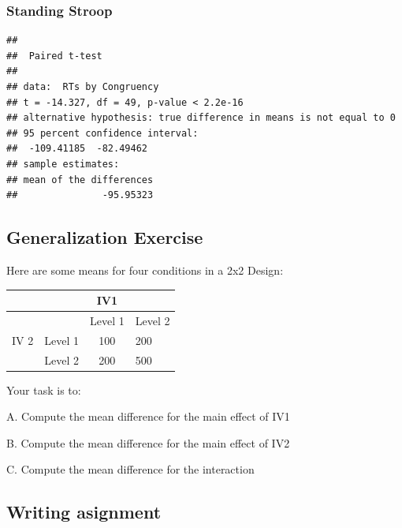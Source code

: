 \documentclass[]{book}
\newenvironment{Shaded}{\begin{snugshade}}{\end{snugshade}}
\newcommand{\KeywordTok}[1]{\textcolor[rgb]{0.13,0.29,0.53}{\textbf{#1}}}
\newcommand{\DataTypeTok}[1]{\textcolor[rgb]{0.13,0.29,0.53}{#1}}
\newcommand{\StringTok}[1]{\textcolor[rgb]{0.31,0.60,0.02}{#1}}
\newcommand{\OtherTok}[1]{\textcolor[rgb]{0.56,0.35,0.01}{#1}}
\newcommand{\OperatorTok}[1]{\textcolor[rgb]{0.81,0.36,0.00}{\textbf{#1}}}
\newcommand{\NormalTok}[1]{#1}
\begin{document}
\subsubsection{Standing Stroop}\label{standing-stroop}

\begin{Shaded}
\end{Shaded}

\begin{verbatim}
## 
##  Paired t-test
## 
## data:  RTs by Congruency
## t = -14.327, df = 49, p-value < 2.2e-16
## alternative hypothesis: true difference in means is not equal to 0
## 95 percent confidence interval:
##  -109.41185  -82.49462
## sample estimates:
## mean of the differences 
##               -95.95323
\end{verbatim}

\subsection{Generalization Exercise}\label{generalization-exercise-9}

Here are some means for four conditions in a 2x2 Design:

\begin{longtable}[]{@{}llcl@{}}
\toprule
& & IV1 &\tabularnewline
\midrule
\endhead
& & Level 1 & Level 2\tabularnewline
IV 2 & Level 1 & 100 & 200\tabularnewline
& Level 2 & 200 & 500\tabularnewline
\bottomrule
\end{longtable}

Your task is to:

A. Compute the mean difference for the main effect of IV1

B. Compute the mean difference for the main effect of IV2

C. Compute the mean difference for the interaction

\subsection{Writing asignment}\label{writing-asignment}
\end{document}
